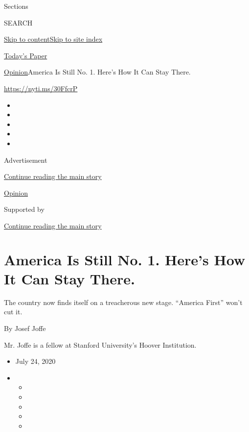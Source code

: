 Sections

SEARCH

\protect\hyperlink{site-content}{Skip to
content}\protect\hyperlink{site-index}{Skip to site index}

\href{https://myaccount.nytimes3xbfgragh.onion/auth/login?response_type=cookie\&client_id=vi}{}

\href{https://www.nytimes3xbfgragh.onion/section/todayspaper}{Today's
Paper}

\href{/section/opinion}{Opinion}\textbar{}America Is Still No. 1. Here's
How It Can Stay There.

\url{https://nyti.ms/30FfcrP}

\begin{itemize}
\item
\item
\item
\item
\item
\end{itemize}

Advertisement

\protect\hyperlink{after-top}{Continue reading the main story}

\href{/section/opinion}{Opinion}

Supported by

\protect\hyperlink{after-sponsor}{Continue reading the main story}

\hypertarget{america-is-still-no-1-heres-how-it-can-stay-there}{%
\section{America Is Still No. 1. Here's How It Can Stay
There.}\label{america-is-still-no-1-heres-how-it-can-stay-there}}

The country now finds itself on a treacherous new stage. ``America
First'' won't cut it.

By Josef Joffe

Mr. Joffe is a fellow at Stanford University's Hoover Institution.

\begin{itemize}
\item
  July 24, 2020
\item
  \begin{itemize}
  \item
  \item
  \item
  \item
  \item
  \end{itemize}
\end{itemize}

